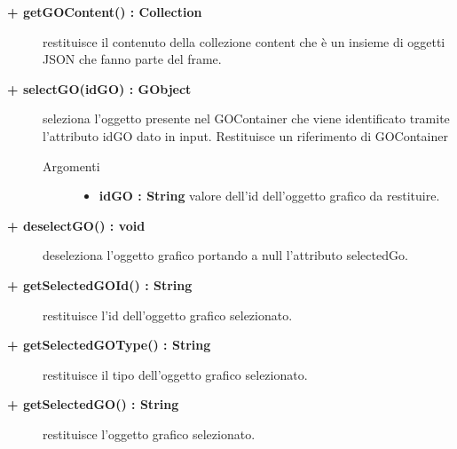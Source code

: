 \begin{description}
\begin{description}
\begin{description}
\end{description}

\end{description}

\begin{description}
		\item[\textbf{\color{blue}+ getGOContent() : Collection			}] \hfill
			restituisce il contenuto della collezione content che è un insieme di oggetti JSON che fanno parte del frame.
\end{description}

\begin{description}
		\item[\textbf{\color{blue}+ selectGO(idGO) : GObject			}] \hfill
			seleziona l'oggetto presente nel GOContainer che viene identificato tramite l'attributo idGO dato in input. Restituisce un riferimento di GOContainer 

\begin{description}
			\item[Argomenti] \hfill
				\begin{itemize}
						\item \textbf{idGO : String			} \hfill
					valore dell'id dell'oggetto grafico da restituire.  				
				\end{itemize}

\end{description}

\end{description}

\begin{description}
		\item[\textbf{\color{blue}+ deselectGO() : void			}] \hfill
			deseleziona l'oggetto grafico portando a null l'attributo selectedGo. 
\end{description}

\begin{description}
		\item[\textbf{\color{blue}+ getSelectedGOId() : String			}] \hfill
			restituisce l'id dell'oggetto grafico selezionato.
\end{description}

\begin{description}
		\item[\textbf{\color{blue}+ getSelectedGOType() : String			}] \hfill
			restituisce il tipo dell'oggetto grafico selezionato.
\end{description}

\begin{description}
		\item[\textbf{\color{blue}+ getSelectedGO() : String			}] \hfill
			restituisce l'oggetto grafico selezionato.
\end{description}


\end{description}
